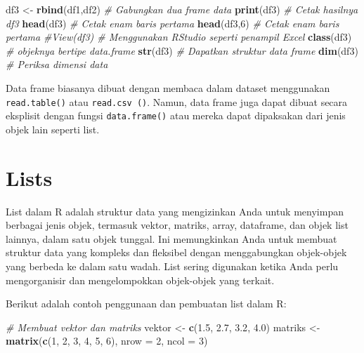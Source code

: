 \documentclass[
]{book}
\newenvironment{Shaded}{\begin{snugshade}}{\end{snugshade}}
\newcommand{\AttributeTok}[1]{\textcolor[rgb]{0.13,0.29,0.53}{#1}}
\newcommand{\CommentTok}[1]{\textcolor[rgb]{0.56,0.35,0.01}{\textit{#1}}}
\newcommand{\DecValTok}[1]{\textcolor[rgb]{0.00,0.00,0.81}{#1}}
\newcommand{\FloatTok}[1]{\textcolor[rgb]{0.00,0.00,0.81}{#1}}
\newcommand{\FunctionTok}[1]{\textcolor[rgb]{0.13,0.29,0.53}{\textbf{#1}}}
\newcommand{\NormalTok}[1]{#1}
\newcommand{\OtherTok}[1]{\textcolor[rgb]{0.56,0.35,0.01}{#1}}
\begin{document}
\begin{Shaded}
\begin{Highlighting}[]
\NormalTok{df3 }\OtherTok{\textless{}{-}} \FunctionTok{rbind}\NormalTok{(df1,df2)                  }\CommentTok{\# Gabungkan dua frame data}
\FunctionTok{print}\NormalTok{(df3)                             }\CommentTok{\# Cetak hasilnya \textasciigrave{}df3\textasciigrave{}}
\FunctionTok{head}\NormalTok{(df3)                              }\CommentTok{\# Cetak enam baris pertama}
\FunctionTok{head}\NormalTok{(df3,}\DecValTok{6}\NormalTok{)                            }\CommentTok{\# Cetak enam baris pertama}
\CommentTok{\#View(df3)                             \# Menggunakan RStudio seperti penampil Excel}
\FunctionTok{class}\NormalTok{(df3)                             }\CommentTok{\# objeknya bertipe data.frame}
\FunctionTok{str}\NormalTok{(df3)                               }\CommentTok{\# Dapatkan struktur data frame}
\FunctionTok{dim}\NormalTok{(df3)                               }\CommentTok{\# Periksa dimensi data}
\end{Highlighting}
\end{Shaded}

Data frame biasanya dibuat dengan membaca dalam dataset menggunakan \texttt{read.table()} atau \texttt{read.csv\ ()}. Namun, data frame juga dapat dibuat secara eksplisit dengan fungsi \texttt{data.frame()} atau mereka dapat dipaksakan dari jenis objek lain seperti list.

\hypertarget{lists}{%
\section{Lists}\label{lists}}

List dalam R adalah struktur data yang mengizinkan Anda untuk menyimpan berbagai jenis objek, termasuk vektor, matriks, array, dataframe, dan objek list lainnya, dalam satu objek tunggal. Ini memungkinkan Anda untuk membuat struktur data yang kompleks dan fleksibel dengan menggabungkan objek-objek yang berbeda ke dalam satu wadah. List sering digunakan ketika Anda perlu mengorganisir dan mengelompokkan objek-objek yang terkait.

Berikut adalah contoh penggunaan dan pembuatan list dalam R:

\begin{Shaded}
\begin{Highlighting}[]
\CommentTok{\# Membuat vektor dan matriks}
\NormalTok{vektor }\OtherTok{\textless{}{-}} \FunctionTok{c}\NormalTok{(}\FloatTok{1.5}\NormalTok{, }\FloatTok{2.7}\NormalTok{, }\FloatTok{3.2}\NormalTok{, }\FloatTok{4.0}\NormalTok{)}
\NormalTok{matriks }\OtherTok{\textless{}{-}} \FunctionTok{matrix}\NormalTok{(}\FunctionTok{c}\NormalTok{(}\DecValTok{1}\NormalTok{, }\DecValTok{2}\NormalTok{, }\DecValTok{3}\NormalTok{, }\DecValTok{4}\NormalTok{, }\DecValTok{5}\NormalTok{, }\DecValTok{6}\NormalTok{), }\AttributeTok{nrow =} \DecValTok{2}\NormalTok{, }\AttributeTok{ncol =} \DecValTok{3}\NormalTok{)}
\end{Highlighting}
\end{Shaded}
\end{document}
